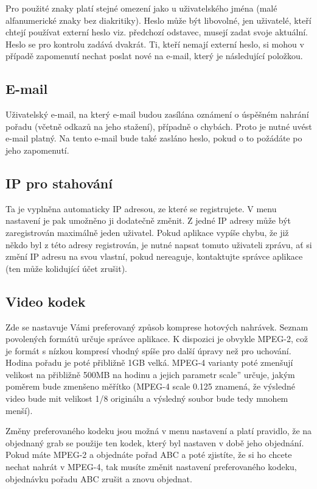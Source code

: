 Pro použité znaky platí stejné omezení jako u uživatelského jména (malé alfanumerické znaky bez diakritiky). Heslo může být libovolné, jen uživatelé, kteří chtejí používat externí heslo viz. předchozí odstavec, musejí zadat svoje aktuální. Heslo se pro kontrolu zadává dvakrát. Ti, kteří nemají externí heslo, si mohou v případě zapomenutí nechat poslat nové na e-mail, který je následující položkou.

\subsection{E-mail}

Uživatelský e-mail, na který e-mail budou zasílána oznámení o úspěšném nahrání pořadu (včetně odkazů na jeho stažení), případně o chybách. Proto je nutné uvést e-mail platný. Na tento e-mail bude také zasláno heslo, pokud o to požádáte po jeho zapomenutí.
\vfil
\pagebreak
\subsection{IP pro stahování}

Ta je vyplněna automaticky IP adresou, ze které se registrujete. V menu nastavení je pak umožněno ji dodatečně změnit. Z jedné IP adresy může být zaregistrován maximálně jeden uživatel. Pokud aplikace vypíše chybu, že již někdo byl z této adresy registrován, je nutné napsat tomuto uživateli zprávu, ať si změní IP adresu na svou vlastní, pokud nereaguje, kontaktujte správce aplikace (ten může kolidující účet zrušit).

\subsection{Video kodek}

Zde se nastavuje Vámi preferovaný způsob komprese hotových nahrávek. Seznam povolených formátů určuje správce aplikace. K dispozici je obvykle MPEG-2, což je formát s nízkou kompresí vhodný spíše pro další úpravy než pro uchování. Hodina pořadu je poté přibližně 1GB velká. MPEG-4 varianty poté zmenšují velikost na přibližně 500MB na hodinu a jejich parametr \quotedblbase scale'' určuje, jakým poměrem bude zmenšeno měřítko (MPEG-4 scale 0.125 znamená, že výsledné video bude mit velikost 1/8 originálu a výsledný soubor bude tedy mnohem menší).

Změny preferovaného kodeku jsou možná v menu nastavení a platí pravidlo, že na objednaný grab se použije ten kodek, který byl nastaven v době jeho objednání. Pokud máte MPEG-2 a objednáte pořad ABC a poté zjistíte, že si ho chcete nechat nahrát v MPEG-4, tak musíte změnit nastavení preferovaného kodeku, objednávku pořadu ABC zrušit a znovu objednat.

